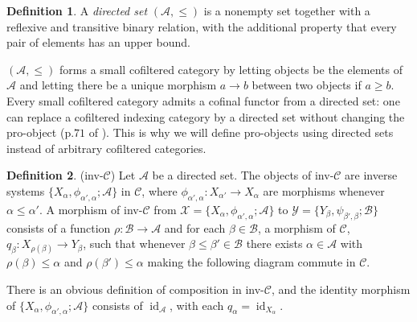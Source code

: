 \documentclass[a4paper,11pt]{article}
\theoremstyle{definition}
\newtheorem{definition}{Definition}[section]
\theoremstyle{plain}
\theoremstyle{remark}
\DeclareMathOperator{\id}{id}
\begin{document}
{\begin{definition} A \textit{directed set} $(\mathcal{A},\leq)$ is a nonempty set together with a reflexive and transitive binary relation, with the additional property that every pair of elements has an upper bound.
\end{definition}


$(\mathcal{A},\leq)$ forms a small cofiltered category by letting objects be the elements of $\mathcal{A}$ and letting there be a unique morphism $a\rightarrow b$ between two objects if $a\geq b$. Every small cofiltered category admits a cofinal functor from a directed set: one can replace a cofiltered indexing category by a directed set without changing the pro-object (p.$71$ of \cite{edwards2006cech}). This is why we will define pro-objects using directed sets instead of arbitrary cofiltered categories.

\begin{definition} (inv-$\mathcal{C}$) Let $\mathcal{A}$ be a directed set. The objects of inv-$\mathcal{C}$ are inverse systems $\{X_{\alpha}, \phi_{\alpha',\alpha}; \mathcal{A}\}$ in $\mathcal{C}$, where $\phi_{\alpha',\alpha}: X_{\alpha'}\rightarrow X_{\alpha}$ are morphisms whenever $\alpha\leq \alpha'$. A morphism of inv-$\mathcal{C}$ from $\mathcal{X}=\{X_{\alpha},\phi_{\alpha',\alpha}; \mathcal{A}\}$ to $\mathcal{Y} = \{Y_{\beta}, \psi_{\beta',\beta}; \mathcal{B}\}$ consists of a function $ \rho:\mathcal{B}\rightarrow \mathcal{A}$ and for each $\beta\in \mathcal{B}$, a morphism of $\mathcal{C}$, $q_{\beta}: X_{ \rho(\beta)}\rightarrow Y_{\beta}$, such that whenever $\beta\leq \beta'\in \mathcal{B}$ there exists $\alpha\in \mathcal{A}$ with $ \rho(\beta)\leq \alpha$ and $ \rho(\beta')\leq \alpha$ making the following diagram commute in $\mathcal{C}$.

\begin{figure}[H]
\center
{}
 \end{figure}
 
 There is an obvious definition of composition in inv-$\mathcal{C}$, and the identity morphism of $\{X_{\alpha},\phi_{\alpha',\alpha}; \mathcal{A}\}$ consists of $\id_{\mathcal{A}}$, with each $q_{\alpha} = \id_{X_{\alpha}}$. 
 

\end{definition}}
\end{document}

